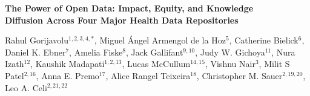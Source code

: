 \documentclass[11pt]{article}
\begin{document}
\begin{center}
\textbf{\large The Power of Open Data: Impact, Equity, and Knowledge\\[3pt]
Diffusion Across Four Major Health Data Repositories}

\vspace{0.4em}

{\footnotesize
Rahul Gorijavolu$^{1,2,3,4,*}$,
Miguel \'Angel Armengol de la Hoz$^{5}$,
Catherine Bielick$^{6}$,
Daniel K. Ebner$^{7}$,
Amelia Fiske$^{8}$,
Jack Gallifant$^{9,10}$,
Judy W. Gichoya$^{11}$,
Nura Izath$^{12}$,
Kaushik Madapati$^{1,2,13}$,
Lucas McCullum$^{14,15}$,
Vishnu Nair$^{3}$,
Milit S Patel$^{2,16}$,
Anna E. Premo$^{17}$,
Alice Rangel Teixeira$^{18}$,
Christopher M. Sauer$^{2,19,20}$,
Leo A. Celi$^{2,21,22}$
}

\vspace{0.2em}


\end{center}
\end{document}
